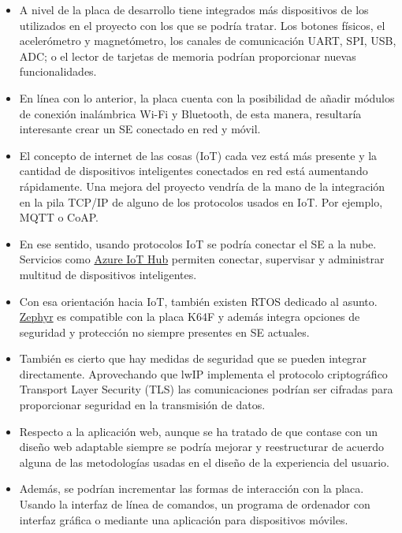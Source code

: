 \begin{itemize}
  \item A nivel de  la placa de desarrollo tiene
  integrados más dispositivos de los utilizados en el proyecto con los que se
  podría tratar. Los botones físicos, el acelerómetro y magnetómetro, los
  canales de comunicación UART, SPI, USB, ADC; o el lector de tarjetas de
  memoria podrían proporcionar nuevas funcionalidades.
  
  \item En línea con lo anterior, la placa cuenta con la posibilidad de añadir
  módulos de conexión inalámbrica Wi-Fi y Bluetooth, de esta manera, resultaría
  interesante crear un SE conectado en red y móvil.
  
  \item El concepto de internet de las cosas (IoT) cada vez está más presente y
  la cantidad de dispositivos inteligentes conectados en red está aumentando
  rápidamente. Una mejora del proyecto vendría de la mano de la
  integración en la pila TCP/IP de alguno de los protocolos usados en IoT. Por
  ejemplo, MQTT o CoAP.

  \item En ese sentido, usando protocolos IoT se podría conectar el SE a la
  nube. Servicios como \href{https://azure.microsoft.com/es-es/services/iot-hub/}
  {Azure IoT Hub} permiten conectar, supervisar y administrar multitud de
  dispositivos inteligentes.

  \item Con esa orientación hacia IoT, también existen RTOS dedicado al asunto.
  \href{https://www.zephyrproject.org/}{Zephyr} es compatible con la placa K64F
  y además integra opciones de seguridad y protección no siempre presentes en
  SE actuales.

  \item También es cierto que hay medidas de seguridad que se pueden integrar
  directamente. Aprovechando que lwIP implementa el protocolo criptográfico
  Transport Layer Security (TLS) las comunicaciones podrían ser cifradas para 
  proporcionar seguridad en la transmisión de datos.

  \item Respecto a la aplicación web, aunque se ha tratado de que contase
  con un diseño web adaptable siempre se podría mejorar y reestructurar de
  acuerdo alguna de las metodologías usadas en el diseño de la experiencia del
  usuario.

  \item Además, se podrían incrementar las formas de interacción con la placa.
  Usando la interfaz de línea de comandos, un programa de ordenador con
  interfaz gráfica o mediante una aplicación para dispositivos móviles.

\end{itemize}
